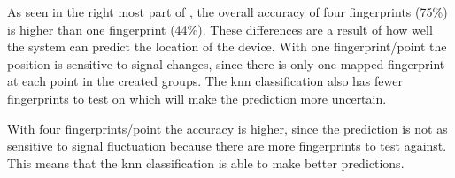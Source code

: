 
As seen in the right most part of , the overall accuracy of four fingerprints (75\%) is higher than one fingerprint (44\%).
These differences are a result of how well the system can predict the location of the device.
With one fingerprint/point the position is sensitive to signal changes, since there is only one mapped fingerprint at each point in the created groups.
The \acrfull{knn} classification also has fewer fingerprints to test on which will make the prediction more uncertain.

\bigskip

With four fingerprints/point the accuracy is higher, since the prediction is not as sensitive to signal fluctuation because there are more fingerprints to test against.
This means that the \acrshort{knn} classification is able to make better predictions. 
